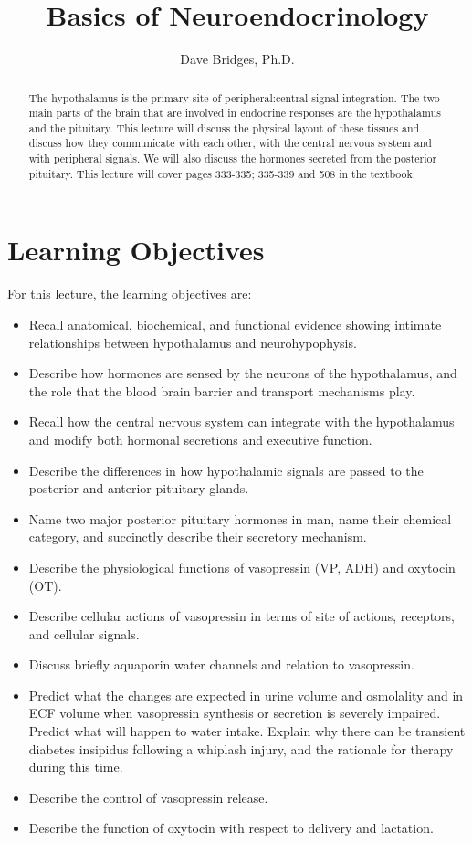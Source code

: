 \documentclass{tufte-handout}
\title{Basics of Neuroendocrinology}
\author{Dave Bridges, Ph.D.}
\begin{document}
\maketitle%

\begin{abstract}
\noindent The hypothalamus is the primary site of peripheral:central signal integration.  The two main parts of the brain that are involved in endocrine responses are the hypothalamus and the pituitary.  This lecture will discuss the physical layout of these tissues and discuss how they communicate with each other, with the central nervous system and with peripheral signals.  We will also discuss the hormones secreted from the posterior pituitary.  This lecture will cover pages 333-335; 335-339 and 508 in the textbook\cite{Widmaier2013}.
\end{abstract}

\tableofcontents

\pagebreak

\section{Learning Objectives}
For this lecture, the learning objectives are:
\begin{itemize}
\item Recall anatomical, biochemical, and functional evidence showing intimate relationships between hypothalamus and neurohypophysis.
\item Describe how hormones are sensed by the neurons of the hypothalamus, and the role that the blood brain barrier and transport mechanisms play.
\item Recall how the central nervous system can integrate with the hypothalamus and modify both hormonal secretions and executive function.
\item Describe the differences in how hypothalamic signals are passed to the posterior and anterior pituitary glands.
\item Name two major posterior pituitary hormones in man, name their chemical category, and succinctly describe their secretory mechanism.
\item Describe the physiological functions of vasopressin (VP, ADH) and oxytocin (OT).
\item Describe cellular actions of vasopressin in terms of site of actions, receptors, and cellular signals.
\item Discuss briefly aquaporin water channels and relation to vasopressin. 
\item Predict what the changes are expected in urine volume and osmolality and in ECF volume when vasopressin synthesis or secretion is severely impaired. Predict what will happen to water intake. Explain why there can be transient diabetes insipidus following a whiplash injury, and the rationale for therapy during this time. 
\item Describe the control of vasopressin release.
\item Describe the function of oxytocin with respect to delivery and lactation.


\end{itemize}
\end{document}
